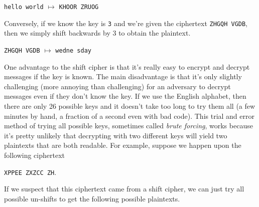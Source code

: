\documentclass[12pt]{article}
\theoremstyle{plain}
\theoremstyle{definition}
\theoremstyle{remark}
\begin{document}
\begin{center}
    \texttt{hello world} $\mapsto$ \texttt{KHOOR ZRUOG}
\end{center}

Conversely, if we know the key is \texttt{3} and we're given the ciphertext \texttt{ZHGQH VGDB}, then we simply shift backwards by 3 to obtain the plaintext.

\begin{center}
    \texttt{ZHGQH VGDB} $\mapsto$ \texttt{wedne sday}
\end{center}

One advantage to the shift cipher is that it's really easy to encrypt and decrypt messages if the key is known.
The main disadvantage is that it's only slightly challenging (more annoying than challenging) for an adversary to decrypt messages even if they don't know the key.
If we use the English alphabet, then there are only 26 possible keys and it doesn't take too long to try them all (a few minutes by hand, a fraction of a second even with bad code).
This trial and error method of trying all possible keys, sometimes called \emph{brute forcing}, works because it's pretty unlikely that decrypting with two different keys will yield two plaintexts that are both readable.
For example, suppose we happen upon the following ciphertext
\begin{center}
    \texttt{XPPEE ZXZCC ZH}.
\end{center}
If we suspect that this ciphertext came from a shift cipher, we can just try all possible un-shifts to get the following possible plaintexts.
\end{document}
